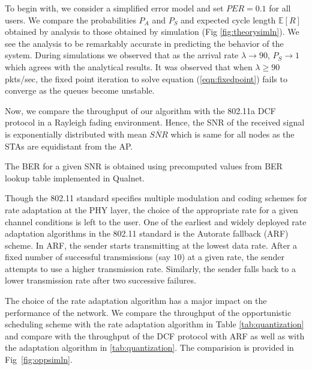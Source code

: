 \documentclass[10pt,conference]{IEEEtran}
\newcommand{\pap}{P_A}
\newcommand{\psta}{P_S}
\newcommand{\renew}{{R}}
\begin{document}
\begin{figure*}[!t]
\null\hfill
\hspace{-1em}
\hfill\null
\caption{Throughput performance of opportunistic scheduling}
\label{fig:oppsimln}
\end{figure*}

To begin with, we consider a simplified error model and set $PER=0.1$ for all users. We compare the probabilities $\pap$ and $\psta$ and expected cycle length $\mathbb{E}[\renew]$ obtained by analysis to those obtained by simulation (Fig \ref{fig:theorysimln}).
We see the analysis to be remarkably accurate in predicting the behavior of the system. During simulations we observed that as the arrival rate $\lambda\to90$, $\psta\to 1$ which agrees with the analytical results.
 It was  observed that when $\lambda\geq90$  pkts/sec, the fixed point iteration to solve equation (\ref{eqn:fixedpoint}) fails to converge as the queues become unstable. 

Now, we compare the throughput of our algorithm with the 802.11a DCF protocol in a Rayleigh fading environment. 
Hence, the SNR of the received signal is exponentially distributed with mean $\overline{SNR}$ which is same for all nodes as the STAs are equidistant from the AP.

The BER for a given SNR is obtained using precomputed values from 
BER lookup table implemented in Qualnet. 

  Though the 802.11 standard specifies multiple modulation and coding schemes for rate adaptation 
at the PHY layer, the choice of the appropriate rate for a given channel conditions is left to the user. 
One of the earliest and widely deployed rate adaptation algorithms in the 802.11 standard is the Autorate fallback (ARF) scheme. In ARF, the sender starts transmitting at the lowest data rate.
 After a fixed number of successful transmissions (say $10$) at a given rate, the sender attempts to use a higher transmission rate. Similarly, the sender falls back to a lower transmission rate after two successive failures.

The choice of the rate adaptation algorithm has a major impact on the performance of the network.
We compare the throughput of the opportunistic scheduling scheme with the rate adaptation algorithm in Table \ref{tab:quantization}  and compare with the throughput of the DCF protocol with ARF as well as with
the adaptation algorithm in \ref{tab:quantization}.
The comparision is provided in Fig~\ref{fig:oppsimln}.
\end{document}
